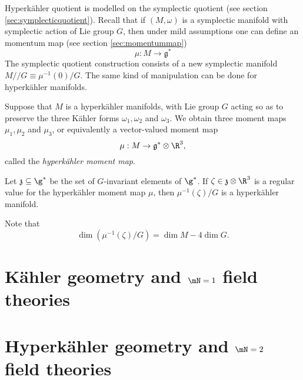 \documentclass{worksheetclass}
\begin{document}
        Hyperkähler quotient is modelled on the symplectic quotient (see section \ref{sec:symplecticquotient}). Recall that if $(M,\omega)$ is a symplectic manifold with symplectic action of Lie group $G$, then under mild assumptions one can define an momentum map (see section \ref{sec:momentummap})
        \begin{equation}
            \mu:M\to\mathfrak{g}^*
        \end{equation}
        The symplectic quotient construction consists of a new symplectic manifold $M//G\equiv\mu^{-1}(0)/G$. The same kind of manipulation can be done for hyperkähler manifolds.

        Suppose that $M$ is a hyperkähler manifolds, with Lie group $G$ acting so as to preserve the three Kähler forms $\omega_1,\omega_2$ and $\omega_3$. We obtain three moment maps $\mu_1,\mu_2$ and $\mu_3$, or equivalently a vector-valued moment map
        \begin{equation}
            \mu:M\to\mathfrak{g^*}\otimes\R^3,
        \end{equation}
        called the \emph{hyperkähler moment map}.
        \begin{theorem}
            Let $\mathfrak{z}\subseteq\g^*$ be the set of $G$-invariant elements of $\g^*$. If $\zeta\in\mathfrak{z}\otimes\R^3$ is a regular value for the hyperkähler moment map $\mu$, then $\mu^{-1}(\zeta)/G$ is a hyperkähler manifold.
        \end{theorem}
        Note that
        \begin{equation}
            \dim(\mu^{-1}(\zeta)/G) = \dim M - 4\dim G.
        \end{equation}

\section{Kähler geometry and $\mN=1$ field theories}

\section{Hyperkähler geometry and $\mN=2$ field theories}
\end{document}
